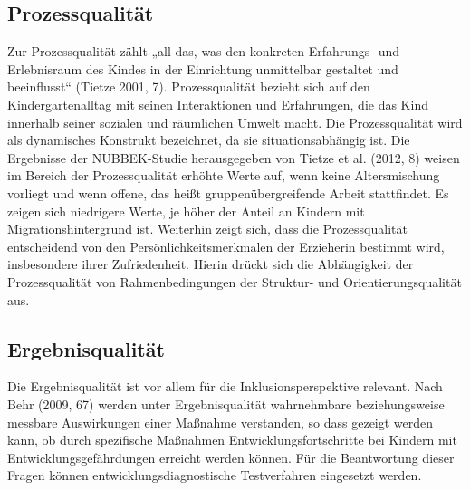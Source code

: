 \subsection{Prozessqualität}\label{Prozessqualität}
Zur Prozessqualität zählt „all das, was den konkreten Erfahrungs- und Erlebnisraum des Kindes in der Einrichtung unmittelbar gestaltet und beeinflusst“ (Tietze 2001, 7). Prozessqualität bezieht sich auf den Kindergartenalltag mit seinen Interaktionen und Erfahrungen, die das Kind innerhalb seiner sozialen und räumlichen Umwelt macht. Die Prozessqualität wird als dynamisches Konstrukt bezeichnet, da sie situationsabhängig ist. Die Ergebnisse der NUBBEK-Studie herausgegeben von Tietze et al. (2012, 8) weisen im Bereich der Prozessqualität erhöhte Werte auf, wenn keine Altersmischung vorliegt und wenn offene, das heißt gruppenübergreifende Arbeit stattfindet. Es zeigen sich niedrigere Werte, je höher der Anteil an Kindern mit Migrationshintergrund ist. Weiterhin zeigt sich, dass die Prozessqualität entscheidend von den Persönlichkeitsmerkmalen der Erzieherin bestimmt wird, insbesondere ihrer Zufriedenheit. Hierin drückt sich die Abhängigkeit der Prozessqualität von Rahmenbedingungen der Struktur- und Orientierungsqualität aus.   

\subsection{Ergebnisqualität}
Die Ergebnisqualität ist vor allem für die Inklusionsperspektive relevant. Nach Behr (2009, 67) werden unter Ergebnisqualität  wahrnehmbare beziehungsweise messbare Auswirkungen einer Maßnahme verstanden, so dass gezeigt werden kann, ob durch spezifische Maßnahmen Entwicklungsfortschritte bei Kindern mit Entwicklungsgefährdungen erreicht werden können. Für die Beantwortung dieser Fragen können entwicklungsdiagnostische Testverfahren eingesetzt werden.


